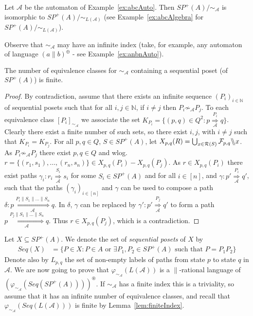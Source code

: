 \documentclass{CSML}
\newcommand{\quotientparallel}[2]{\ensuremath{#1\backslash\kern-3pt\backslash#2}}
\begin{document}
\begin{exa}
  Let $\mathcal{A}$ be the automaton of Example~\ref{ex:abcAuto}. Then $SP^+(A)/\mathord{\sim_{\mathcal{A}}}$ is isomorphic to $SP^+(A)/\mathord{\sim_{L(\mathcal{A})}}$ (see Example~\ref{ex:abcAlgebra} for $SP^+(A)/\mathord{\sim_{L(\mathcal{A})}}$).
\end{exa}

Observe that $\sim_{\mathcal{A}}$ may have an infinite index (take, for example, any automaton of language $(a\parallel b)^\oplus$ - see Example~\ref{ex:anbnAuto}).

\begin{lem}
  \label{lem:finiteIndex}
  The number of equivalence classes for $\sim_{\mathcal{A}}$ containing a sequential poset (of $SP^+(A)$) is finite.
\end{lem}

\begin{proof}
  By contradiction, assume that there exists an infinite sequence $(P_i)_{i\in\mathbb{N}}$ of sequential posets such that for all $i,j\in\mathbb{N}$, if $i\not=j$ then $P_i\not\sim_{\mathcal{A}}P_j$.
  To each equivalence class $[P_i]_{\sim_\mathcal{A}}$  we associate the set $K_{P_i}=\{(p,q)\in Q^2 : p \mathop{\Longrightarrow}\limits_{\mathcal{A}}^{P_{i}} q\}$.
  Clearly there exist a finite number of such sets, so there exist $i,j$, with $i\not=j$ such that $K_{P_i}=K_{P_j}$.
  For all $p,q\in Q$, $S\in SP^+(A)$, let $X_{p,q}(R)=\mathop\bigcup_{x\in \mathcal{R}(S)}\quotientparallel{\mathcal{F}_{p,q}}{x}$.
  As $P_i\not\sim_{\mathcal{A}}P_j$ there exist $p,q\in Q$ and wlog. $r=\{(r_1,s_1),\dots,(r_n,s_n)\}\in X_{p,q}(P_i)-X_{p,q}(P_j)$.
  As $r\in X_{p,q}(P_i)$ there exist paths $\gamma_i:r_i \mathop{\Longrightarrow}\limits_{\mathcal{A}}^{S_i} s_i$ for some $S_i\in SP^+(A)$ and for all $i\in[n]$, and $\gamma:p' \mathop{\Longrightarrow}\limits_{\mathcal{A}}^{P_i} q'$, such that the paths $(\gamma_i)_{i\in[n]}$ and $\gamma$ can be used to compose a path $\delta:p \mathop{\Longrightarrow}\limits_{\mathcal{A}}^{P_i\parallel S_1\parallel\dots\parallel S_n} q$. In $\delta$, $\gamma$ can be replaced by $\gamma':p'\mathop{\Longrightarrow}\limits_{\mathcal{A}}^{P_j} q'$ to form a path $p \mathop{\Longrightarrow}\limits_{\mathcal{A}}^{P_j\parallel S_1\parallel\dots\parallel S_n} q$. Thus $r\in X_{p,q}(P_j)$, which is a contradiction.
\end{proof}

Let $X\subseteq SP^+(A)$. We denote the set of \emph{sequential posets} of $X$ by
\begin{align*}
  Seq(X) &= \{P\in X : P\in A\text{ or }\exists P_1,P_2\in SP^+(A)\text{ such that }P=P_1P_2\}
\end{align*}
Denote also by $L_{p,q}$ the set of non-empty labels of paths from state $p$ to state $q$ in $\mathcal{A}$.
We are now going to prove that $\varphi_{\sim_\mathcal{A}}(L(\mathcal{A}))$ is a $\parallel$-rational language of $(\varphi_{\sim_\mathcal{A}}(Seq(SP^+(A))))^\circledast$. If $\sim_{\mathcal{A}}$ has a finite index this is a triviality, so assume that it has an infinite number of equivalence classes, and recall that $\varphi_{\sim_\mathcal{A}}(Seq(L(\mathcal{A})))$ is finite by Lemma~\ref{lem:finiteIndex}. 
\end{document}
